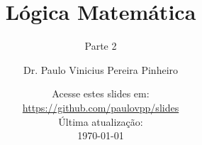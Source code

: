 \title{Lógica Matemática}
\subtitle{Parte 2}
\author[Paulo Pinheiro]
{Dr. Paulo Vinicius Pereira Pinheiro}
%
\date{\small{Acesse estes slides em:\\ \url{https://github.com/paulovpp/slides}}\newline \\Última atualização:\\ \today}
%
